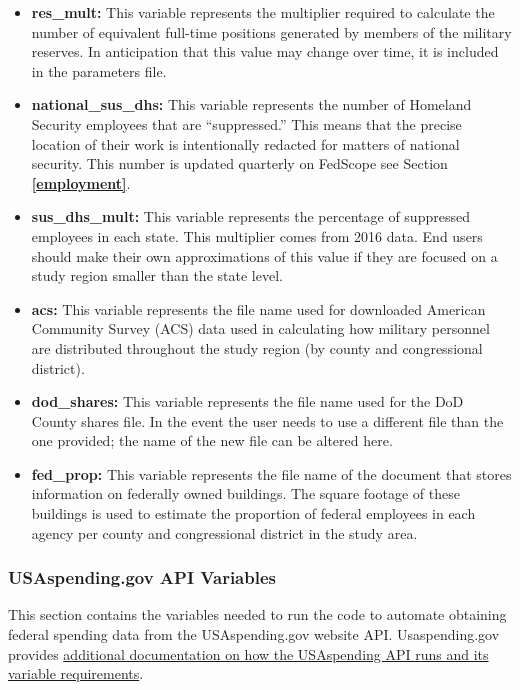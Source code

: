 \documentclass[
]{book}
\providecommand{\tightlist}{%
  \setlength{\itemsep}{0pt}\setlength{\parskip}{0pt}}
\begin{document}
\begin{itemize}
\tightlist
\item
  \textbf{res\_mult:} This variable represents the multiplier required to calculate the number of equivalent full-time positions generated by members of the military reserves. In anticipation that this value may change over time, it is included in the parameters file.\\
\item
  \textbf{national\_sus\_dhs:} This variable represents the number of Homeland Security employees that are ``suppressed.'' This means that the precise location of their work is intentionally redacted for matters of national security. This number is updated quarterly on FedScope see Section \textbf{\ref{employment}}.
\item
  \textbf{sus\_dhs\_mult:} This variable represents the percentage of suppressed employees in each state. This multiplier comes from 2016 data. End users should make their own approximations of this value if they are focused on a study region smaller than the state level.
\item
  \textbf{acs:} This variable represents the file name used for downloaded American Community Survey (ACS) data used in calculating how military personnel are distributed throughout the study region (by county and congressional district).\\
\item
  \textbf{dod\_shares:} This variable represents the file name used for the DoD County shares file. In the event the user needs to use a different file than the one provided; the name of the new file can be altered here.\\
\item
  \textbf{fed\_prop:} This variable represents the file name of the document that stores information on federally owned buildings. The square footage of these buildings is used to estimate the proportion of federal employees in each agency per county and congressional district in the study area.
\end{itemize}

\hypertarget{usa-api}{%
\subsubsection{USAspending.gov API Variables}\label{usa-api}}

This section contains the variables needed to run the code to automate obtaining federal spending data from the USAspending.gov website API. Usaspending.gov provides \href{https://github.com/fedspendingtransparency/usaspending-api/blob/master/usaspending_api/api_contracts/contracts/v2/bulk_download/awards.md}{additional documentation on how the USAspending API runs and its variable requirements}.
\end{document}
